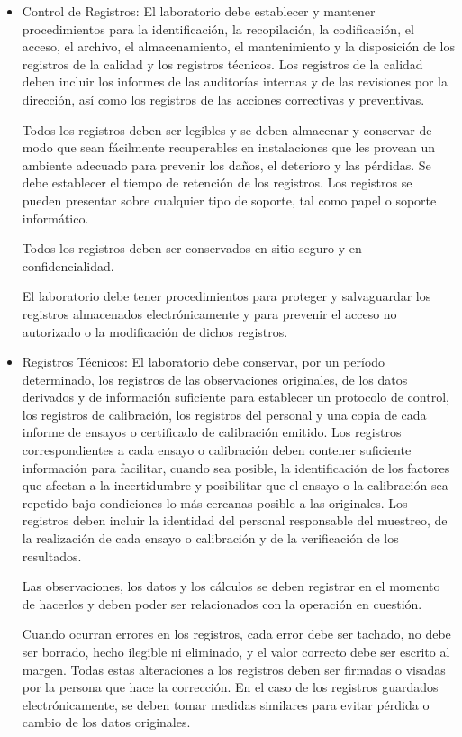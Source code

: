 \begin{itemize}
	\item Control de Registros: El laboratorio debe establecer y mantener procedimientos para la identificación, la recopilación,
	la codificación, el acceso, el archivo, el almacenamiento, el mantenimiento y la disposición de los registros de
	la calidad y los registros técnicos. Los registros de la calidad deben incluir los informes de las auditorías
	internas y de las revisiones por la dirección, así como los registros de las acciones correctivas y preventivas.
	
	\par \noindent
	Todos los registros deben ser legibles y se deben almacenar y conservar de modo que sean
	fácilmente recuperables en instalaciones que les provean un ambiente adecuado para prevenir los daños, el deterioro y las pérdidas. Se debe establecer el tiempo de retención de los registros. Los registros se pueden presentar sobre cualquier tipo de soporte, tal como papel o soporte informático.
	
	\par \noindent
	Todos los registros deben ser conservados en sitio seguro y en confidencialidad.
	
	\par \noindent
	El laboratorio debe tener procedimientos para proteger y salvaguardar los registros almacenados
	electrónicamente y para prevenir el acceso no autorizado o la modificación de dichos registros.
	
	\item Registros Técnicos: El laboratorio debe conservar, por un período determinado, los registros de las observaciones
	originales, de los datos derivados y de información suficiente para establecer un protocolo de control, los
	registros de calibración, los registros del personal y una copia de cada informe de ensayos o certificado de
	calibración emitido. Los registros correspondientes a cada ensayo o calibración deben contener suficiente
	información para facilitar, cuando sea posible, la identificación de los factores que afectan a la incertidumbre y
	posibilitar que el ensayo o la calibración sea repetido bajo condiciones lo más cercanas posible a las
	originales. Los registros deben incluir la identidad del personal responsable del muestreo, de la realización de
	cada ensayo o calibración y de la verificación de los resultados.
	
	\par \noindent
	Las observaciones, los datos y los cálculos se deben registrar en el momento de hacerlos y
	deben poder ser relacionados con la operación en cuestión.
	
	\par \noindent
	Cuando ocurran errores en los registros, cada error debe ser tachado, no debe ser borrado,
	hecho ilegible ni eliminado, y el valor correcto debe ser escrito al margen. Todas estas alteraciones a los
	registros deben ser firmadas o visadas por la persona que hace la corrección. En el caso de los registros
	guardados electrónicamente, se deben tomar medidas similares para evitar pérdida o cambio de los datos
	originales.\cite{iso17025}
\end{itemize}

